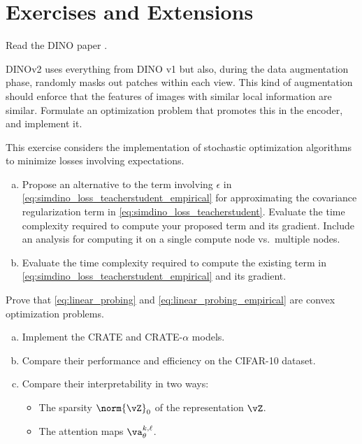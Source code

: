 \documentclass[../../book-main.tex]{subfiles}
\begin{document}
\section{Exercises and Extensions}

\begin{exercise}
Read the DINO paper \citep{caron2021emerging}.
\end{exercise}

\begin{exercise}
DINOv2 \citep{oquab2023dinov2} uses everything from DINO v1 but also,
during the data augmentation phase, randomly masks out patches within
each view. This kind of augmentation should enforce that the features
of images with similar local information are similar. Formulate an
optimization problem that promotes this in the encoder, and implement it.
\end{exercise}

\begin{exercise}
This exercise considers the implementation of stochastic optimization
algorithms to minimize losses involving expectations.
\begin{enumerate}[(a)]
\item Propose an alternative to the term involving \(\epsilon\) in
    \eqref{eq:simdino_loss_teacherstudent_empirical} for
    approximating the covariance regularization term in
    \eqref{eq:simdino_loss_teacherstudent}. Evaluate the time
    complexity required to compute your proposed term and its
    gradient. Include an analysis for computing it on a single
    compute node vs.~multiple nodes.
\item Evaluate the time complexity required to compute the existing
    term in \eqref{eq:simdino_loss_teacherstudent_empirical} and its gradient.
\end{enumerate}
\end{exercise}

\begin{exercise}
Prove that \eqref{eq:linear_probing} and
\eqref{eq:linear_probing_empirical} are convex optimization problems.
\end{exercise}

\begin{exercise}
\phantom{}
\begin{enumerate}[(a)]
\item Implement the CRATE and CRATE-\(\alpha\) models.
\item Compare their performance and efficiency on the CIFAR-10 dataset.
\item Compare their interpretability in two ways:
    \begin{itemize}
        \item The sparsity \(\norm{\vZ}_{0}\) of the representation \(\vZ\).
        \item The attention maps \(\va_{\theta}^{k, \ell}\).
    \end{itemize}
\end{enumerate}
\end{exercise}
\end{document}
